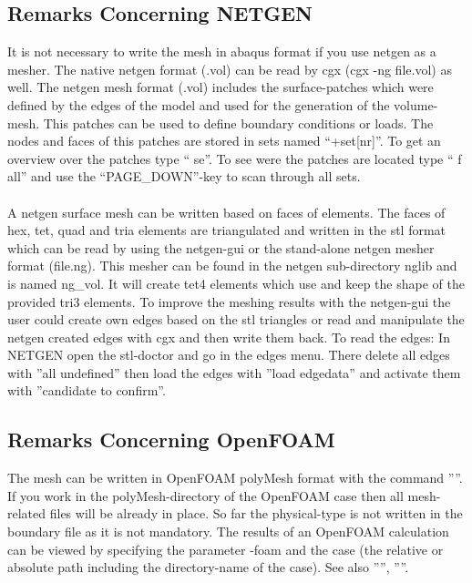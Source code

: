 \documentclass{article}
\begin{document}
\begin{appendix}
\subsection{\label{Remarks Concerning NETGEN}Remarks Concerning NETGEN}
It is not necessary to write the mesh in abaqus format if you use netgen as a mesher. The native netgen format (.vol) can be read by cgx (cgx -ng file.vol) as well. The netgen mesh format (.vol) includes the surface-patches which were defined by the edges of the model and used for the generation of the volume-mesh. This patches can be used to define boundary conditions or loads. The nodes and faces of this patches are stored in sets named ``+set[nr]''. To get an overview over the patches type `` se''. To see were the patches are located type `` f all'' and use the ``PAGE\_DOWN''-key to scan through all sets.\\\\
A netgen surface mesh can be written based on faces of elements. The faces of hex, tet, quad and tria elements are triangulated and written in the stl format which can be read by using the netgen-gui or the stand-alone netgen mesher format (file.ng). This mesher can be found in the netgen sub-directory nglib and is named ng\_vol. It will create tet4 elements which use and keep the shape of the provided tri3 elements. To improve the meshing results with the netgen-gui the user could create own edges based on the stl triangles or read and manipulate the netgen created edges with cgx and then write them back. To read the edges: In NETGEN open the stl-doctor and go in the edges menu. There delete all edges with ''all undefined'' then load the edges with ''load edgedata'' and activate them with ''candidate to confirm''.

\subsection{\label{Remarks Concerning OpenFOAM}Remarks Concerning OpenFOAM}
The mesh can be written in OpenFOAM polyMesh format with the command ''''. If you work in the polyMesh-directory of the OpenFOAM case then all mesh-related files will be already in place. So far the physical-type is not written in the boundary file as it is not mandatory. The results of an OpenFOAM calculation can be viewed by specifying the parameter -foam and the case (the relative or absolute path including the directory-name of the case). See also '''', ''''.


\end{appendix}
\end{document}
